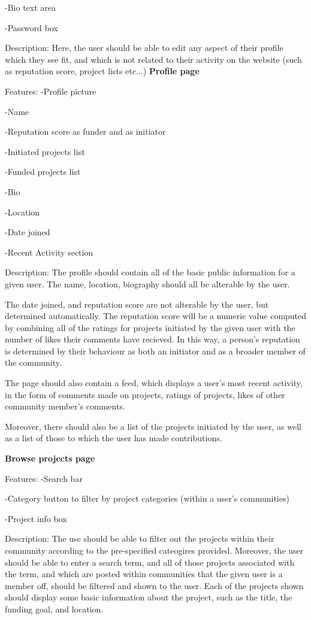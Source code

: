 \documentclass[12pt]{article}
\begin{document}
\begin{enumerate}
-Bio text area

-Password box

Description:
Here, the user should be able to edit any aspect of their profile which they see fit, and which is not related to their activity
on the website (such as reputation score, project lists etc...)
\textbf{Profile page}

Features:
-Profile picture

-Name

-Reputation score as funder and as initiator

-Initiated projects list

-Funded projects list

-Bio

-Location

-Date joined

-Recent Activity section

Description:
The profile should contain all of the basic public information for a given user. The name, location, biography should all be
alterable by the user.

The date joined, and reputation score are not alterable by the user, but determined automatically.
The reputation score will be a numeric value computed by combining all of the ratings for projects initiated by the given user with 
the number of likes their comments have recieved. In this way, a person's reputation is determined by their behaviour as both an initiator
and as a broader member of the community.

The page should also contain a feed, which displays a user's most recent activity, in the form of comments made on projects, ratings of projects,
likes of other community member's comments.

Moreover, there should also be a list of the projects initiated by the user, as well as a list of those to which the user has made contributions.

\textbf{Browse projects page}

Features:
-Search bar

-Category button to filter by project categories (within a user's communities)

-Project info box

Description:
The use should be able to filter out the projects within their community according to the pre-specified cateogires provided.
Moreover, the user should be able to enter a search term, and all of those projects associated with the term, 
and which are posted within communities
that the given user is a member off, should be filtered and shown to the user.
Each of the projects shown should display some basic information about the project, such as the title, the funding goal, and location.


\end{enumerate}
\end{document}
